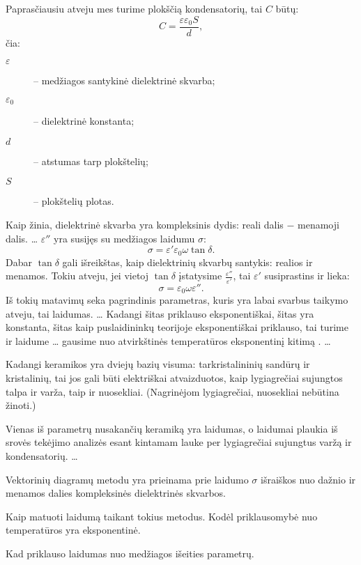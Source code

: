 Paprasčiausiu atveju mes turime plokščią kondensatorių, tai $C$ būtų:
\begin{equation*}
  C = \frac{\varepsilon \varepsilon_{0} S}{d},
\end{equation*}
čia:
\begin{description}
  \item[$\varepsilon$] – medžiagos santykinė dielektrinė skvarba;
  \item[$\varepsilon_{0}$] – dielektrinė konstanta;
  \item[$d$] – atstumas tarp plokštelių;
  \item[$S$] – plokštelių plotas.
\end{description}
Kaip žinia, dielektrinė skvarba yra kompleksinis dydis: reali dalis
$-$ menamoji dalis. … $\varepsilon''$ yra susijęs su medžiagos
laidumu $\sigma$:
\begin{equation*}
  \sigma = \varepsilon' \varepsilon_{0} \omega \tan \delta.
\end{equation*}
Dabar $\tan \delta$ gali išreikštas, kaip dielektrinių skvarbų santykis:
realios ir menamos. Tokiu atveju, jei vietoj $\tan \delta$ įstatysime
$\frac{\varepsilon''}{\varepsilon'}$, tai $\varepsilon'$ susiprastins
ir lieka:
\begin{equation*}
  \sigma = \varepsilon_{0} \omega \varepsilon''.
\end{equation*}
Iš tokių matavimų seka pagrindinis parametras, kuris yra labai
svarbus taikymo atveju, tai laidumas. … Kadangi šitas
priklauso eksponentiškai, šitas yra konstanta, šitas kaip puslaidininkų
teorijoje eksponentiškai priklauso, tai turime ir laidume …
gausime nuo atvirkštinės temperatūros eksponentinį kitimą .
… 

\begin{remember}
  \item Kadangi keramikos yra dviejų bazių visuma: tarkristalininių
    sandūrų ir kristalinių, tai jos gali būti elektriškai atvaizduotos,
    kaip lygiagrečiai sujungtos talpa ir varža, taip ir nuosekliai.
    (Nagrinėjom lygiagrečiai, nuosekliai nebūtina žinoti.)
  \item Vienas iš parametrų nusakančių keramiką yra laidumas, o laidumai
    plaukia iš srovės tekėjimo analizės esant kintamam lauke per
    lygiagrečiai sujungtus varžą ir kondensatorių. …
  \item Vektorinių diagramų metodu yra prieinama prie laidumo
    $\sigma$ išraiškos nuo dažnio ir menamos dalies kompleksinės
    dielektrinės skvarbos.
  \item Kaip matuoti laidumą taikant tokius metodus. Kodėl priklausomybė
    nuo temperatūros yra eksponentinė. 
  \item Kad priklauso laidumas nuo medžiagos išeities parametrų.
\end{remember}


